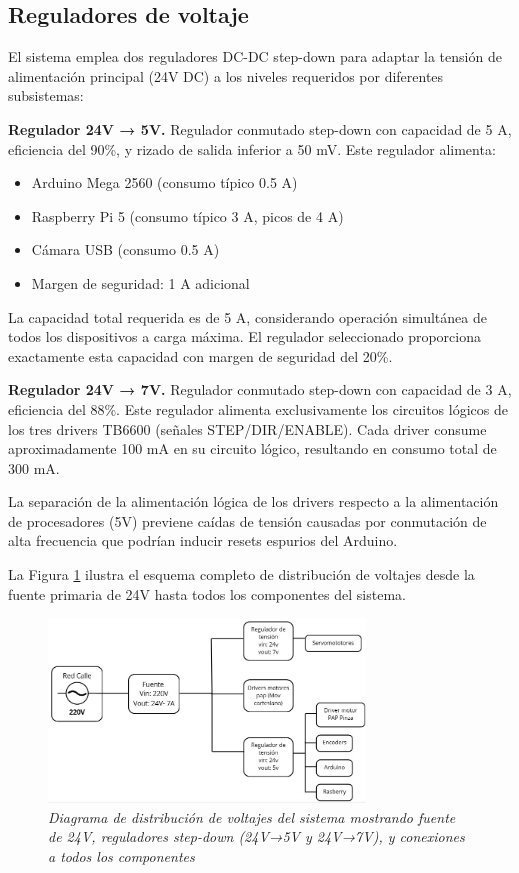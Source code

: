 \subsection{Reguladores de voltaje}

El sistema emplea dos reguladores DC-DC step-down para adaptar la tensión de alimentación principal (24V DC) a los niveles requeridos por diferentes subsistemas:

\textbf{Regulador 24V → 5V.} Regulador conmutado step-down con capacidad de 5 A, eficiencia del 90\%, y rizado de salida inferior a 50 mV. Este regulador alimenta:
\begin{itemize}[label=$\bullet$]
\item Arduino Mega 2560 (consumo típico 0.5 A)
\item Raspberry Pi 5 (consumo típico 3 A, picos de 4 A)
\item Cámara USB (consumo 0.5 A)
\item Margen de seguridad: 1 A adicional
\end{itemize}

La capacidad total requerida es de 5 A, considerando operación simultánea de todos los dispositivos a carga máxima. El regulador seleccionado proporciona exactamente esta capacidad con margen de seguridad del 20\%.

\textbf{Regulador 24V → 7V.} Regulador conmutado step-down con capacidad de 3 A, eficiencia del 88\%. Este regulador alimenta exclusivamente los circuitos lógicos de los tres drivers TB6600 (señales STEP/DIR/ENABLE). Cada driver consume aproximadamente 100 mA en su circuito lógico, resultando en consumo total de 300 mA.

La separación de la alimentación lógica de los drivers respecto a la alimentación de procesadores (5V) previene caídas de tensión causadas por conmutación de alta frecuencia que podrían inducir resets espurios del Arduino.

La Figura \ref{fig:diagrama_voltajes} ilustra el esquema completo de distribución de voltajes desde la fuente primaria de 24V hasta todos los componentes del sistema.

\begin{figure}[H]
\centering
\includegraphics[width=0.75\textwidth]{imagenes/diagrama_voltajes.jpg}
\caption{\textit{Diagrama de distribución de voltajes del sistema mostrando fuente de 24V, reguladores step-down (24V→5V y 24V→7V), y conexiones a todos los componentes}}
\label{fig:diagrama_voltajes}
\end{figure}
